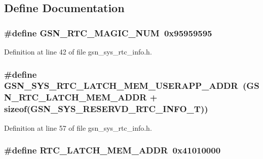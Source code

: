 \subsection{Define Documentation}
\hypertarget{a00595_a058c7e0274d265d046d3f59834005b9a}{
\subsubsection[{GSN\_\-RTC\_\-MAGIC\_\-NUM}]{\setlength{\rightskip}{0pt plus 5cm}\#define GSN\_\-RTC\_\-MAGIC\_\-NUM~0x95959595}}
\label{a00595_a058c7e0274d265d046d3f59834005b9a}


Definition at line 42 of file gsn\_\-sys\_\-rtc\_\-info.h.

\hypertarget{a00595_a4737841c843e54b342545d80a1cc76d3}{
\subsubsection[{GSN\_\-SYS\_\-RTC\_\-LATCH\_\-MEM\_\-USERAPP\_\-ADDR}]{\setlength{\rightskip}{0pt plus 5cm}\#define GSN\_\-SYS\_\-RTC\_\-LATCH\_\-MEM\_\-USERAPP\_\-ADDR~(GSN\_\-RTC\_\-LATCH\_\-MEM\_\-ADDR + sizeof({\bf GSN\_\-SYS\_\-RESERVD\_\-RTC\_\-INFO\_\-T}))}}
\label{a00595_a4737841c843e54b342545d80a1cc76d3}


Definition at line 57 of file gsn\_\-sys\_\-rtc\_\-info.h.

\hypertarget{a00595_a7a3a4ce1e7c7b69b4bfde0215e0ac8fc}{
\subsubsection[{RTC\_\-LATCH\_\-MEM\_\-ADDR}]{\setlength{\rightskip}{0pt plus 5cm}\#define RTC\_\-LATCH\_\-MEM\_\-ADDR~0x41010000}}
\label{a00595_a7a3a4ce1e7c7b69b4bfde0215e0ac8fc}


